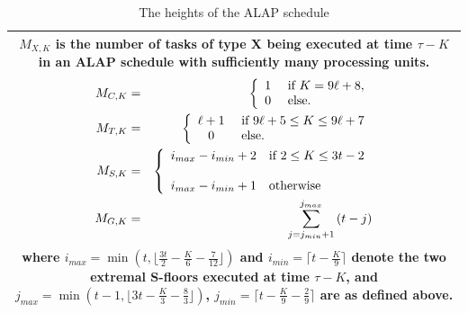 \begin{frame}
\tiny
\begin{table}
\renewcommand{\arraystretch}{1.6}
\caption {The heights of the ALAP schedule}
\centering
\begin{tabular}{|c|}
\hline
\begin{minipage}{7cm}
$M_{X,K}$ is the number of
tasks of type X being executed at time $\tau - K$ in an ALAP schedule with
sufficiently many processing units.
\begin{eqnarray}
\nonumber
M_{C,K} & = &
\left\{\begin{array}{cl}
1&\textmd{ if } K = 9\ell +8,\\
0&\textmd{ else.}
\end{array}\right.\\
\nonumber
M_{T,K} & = &
\left\{\begin{array}{cl}
\ell+1&\textmd{ if } 9\ell + 5 \leq K \leq  9\ell + 7\\
0&\textmd{ else.}
\end{array}\right.\\
\nonumber
M_{S,K} & = &
\left\{\begin{array}{cl}

i_{max}  %
- i_{min} +2&\textmd{if } 2\leq K \leq 3t -2\\
\\
i_{max}  %
- i_{min} +1 &\textmd{otherwise}
\end{array}\right.\\
\nonumber
M_{G,K} & = &
\sum_{j = j_{min}+1}^{j_{max}}
\left( t - j \right)
\end{eqnarray}
where $i_{max} = \min\left(t, \lfloor \frac{3t}{2} - \frac{K}{6} - \frac{7}{12}
\rfloor \right)$ and $i_{min} = \lceil t - \frac{K}{9}\rceil$ denote the two
extremal S-floors executed at time $\tau-K$, and $j_{max} = \min\left(t-1,
\lfloor 3t - \frac{K}{3} - \frac{8}{3}\rfloor \right)$, $j_{min} = \lceil t -
\frac{K}{9} - \frac{2}{9}\rceil$ are as defined above.
\end{minipage}\\
\hline
\end{tabular}
\end{table}


\end{frame}

